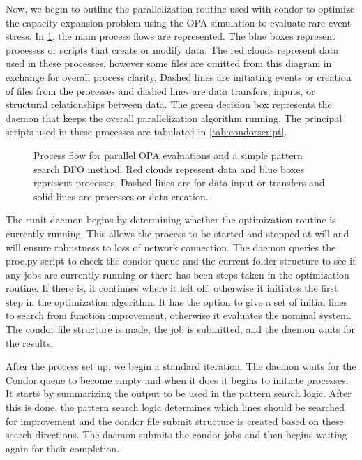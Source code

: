 Now, we begin to outline the parallelization routine used with condor to optimize the capacity expansion problem using the OPA simulation to evaluate rare event stress.  In \cref{fig:parallel}, the main process flows are represented.  The blue boxes represent processes or scripts that create or modify data.  The red clouds represent data used in these processes, however some files are omitted from this diagram in exchange for overall process clarity.  Dashed lines are initiating events or creation of files from the processes and dashed lines are data transfers, inputs, or structural relationships between data.  The green decision box represents the daemon that keeps the overall parallelization algorithm running.  The principal scripts used in these processes are tabulated in \cref{tab:condorscript}.

\linespread{1}
\begin{figure}
\centering
\footnotesize

\caption[Process flow for parallel OPA evaluations]{Process flow for parallel OPA evaluations and a simple pattern search DFO method.  Red clouds represent data and blue boxes represent processes.  Dashed lines are for data input or transfers and solid lines are processes or data creation. }
\label{fig:parallel}
\end{figure}
\linespread{2}

The runit daemon begins by determining whether the optimization routine is currently running.  This allows the process to be started and stopped at will and will ensure robustness to loss of network connection.  The daemon queries the proc.py script to check the condor queue and the current folder structure to see if any jobs are currently running or there has been steps taken in the optimization routine.  If there is, it continues where it left off, otherwise it initiates the first step in the optimization algorithm.  It has the option to give a set of initial lines to search from function improvement, otherwise it evaluates the nominal system.  The condor file structure is made, the job is submitted, and the daemon waits for the results.
%

After the process set up, we begin a standard iteration.  The daemon waits for the Condor queue to become empty and when it does it begins to initiate processes.  It starts by summarizing the output to be used in the pattern search logic.  After this is done, the pattern search logic determines which lines should be searched for improvement and the condor file submit structure is created based on these search directions.  The daemon submits the condor jobs and then begins waiting again for their completion.

